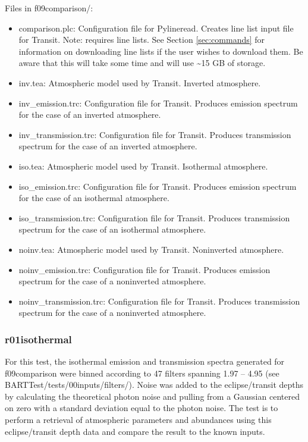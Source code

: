 \documentclass[letterpaper, 12pt]{article}
\begin{document}
Files in f09comparison/:
\begin{itemize} \itemsep0pt
  \item comparison.plc: Configuration file for Pylineread. Creates 
        line list input file for Transit. Note: requires line lists. See 
        Section \ref{sec:commands} for information on downloading line lists if 
        the user wishes to download them. Be aware that this will take some 
        time and will use {\sim}15 GB of storage.
  \item inv.tea: Atmospheric model used by Transit. Inverted atmosphere.
  \item inv{\_}emission.trc: Configuration file for Transit. Produces 
        emission spectrum for the case of an inverted atmosphere.
  \item inv{\_}transmission.trc: Configuration file for Transit. Produces 
        transmission spectrum for the case of an inverted atmosphere.
  \item iso.tea: Atmospheric model used by Transit. Isothermal atmosphere.
  \item iso{\_}emission.trc: Configuration file for Transit. Produces 
        emission spectrum for the case of an isothermal atmosphere.
  \item iso{\_}transmission.trc: Configuration file for Transit. Produces 
        transmission spectrum for the case of an isothermal atmosphere.
  \item noinv.tea: Atmospheric model used by Transit. Noninverted atmosphere.
  \item noinv{\_}emission.trc: Configuration file for Transit. Produces 
        emission spectrum for the case of a noninverted atmosphere.
  \item noinv{\_}transmission.trc: Configuration file for Transit. Produces 
        transmission spectrum for the case of a noninverted atmosphere.
\end{itemize}

\subsubsection{r01isothermal}
\label{sec:retrievals}
For this test, the isothermal emission and transmission spectra generated for 
f09comparison were binned according to 47 filters spanning 
1.97 -- 4.95 \microns (see BARTTest/tests/00inputs/filters/). 
Noise was added to the eclipse/transit 
depths by calculating the theoretical photon noise and pulling from a Gaussian 
centered on zero with a standard deviation equal to the photon noise. The test 
is to perform a retrieval of atmospheric parameters and abundances using this 
eclipse/transit depth data and compare the result to the known inputs.
\end{document}
